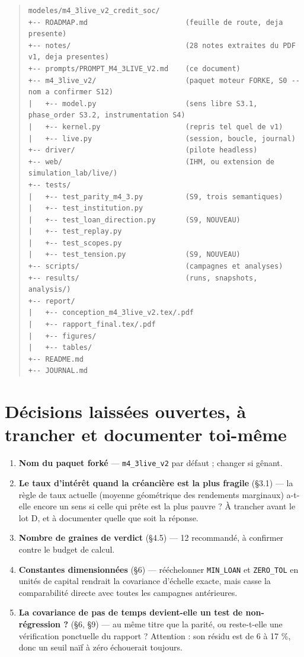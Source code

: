 \documentclass[11pt,a4paper]{article}
\newcommand{\code}[1]{\texttt{#1}}
\begin{document}
\begin{quote}\footnotesize
\begin{verbatim}
modeles/m4_3live_v2_credit_soc/
+-- ROADMAP.md                       (feuille de route, deja presente)
+-- notes/                           (28 notes extraites du PDF v1, deja presentes)
+-- prompts/PROMPT_M4_3LIVE_V2.md    (ce document)
+-- m4_3live_v2/                     (paquet moteur FORKE, S0 -- nom a confirmer S12)
|   +-- model.py                     (sens libre S3.1, phase_order S3.2, instrumentation S4)
|   +-- kernel.py                    (repris tel quel de v1)
|   +-- live.py                      (session, boucle, journal)
+-- driver/                          (pilote headless)
+-- web/                             (IHM, ou extension de simulation_lab/live/)
+-- tests/
|   +-- test_parity_m4_3.py          (S9, trois semantiques)
|   +-- test_institution.py
|   +-- test_loan_direction.py       (S9, NOUVEAU)
|   +-- test_replay.py
|   +-- test_scopes.py
|   +-- test_tension.py              (S9, NOUVEAU)
+-- scripts/                         (campagnes et analyses)
+-- results/                         (runs, snapshots, analysis/)
+-- report/
|   +-- conception_m4_3live_v2.tex/.pdf
|   +-- rapport_final.tex/.pdf
|   +-- figures/
|   +-- tables/
+-- README.md
+-- JOURNAL.md
\end{verbatim}
\end{quote}

\bigskip

\setcounter{section}{11}
\section{Décisions laissées ouvertes, à trancher et documenter toi-même}

\begin{enumerate}
\item \textbf{Nom du paquet forké} --- \code{m4\_3live\_v2} par défaut ; changer si gênant.
\item \textbf{Le taux d'intérêt quand la créancière est la plus fragile} (§3.1) --- la règle de taux actuelle (moyenne géométrique des rendements marginaux) a-t-elle encore un sens si celle qui prête est la plus pauvre ? À trancher avant le lot D, et à documenter quelle que soit la réponse.
\item \textbf{Nombre de graines de verdict} (§4.5) --- 12 recommandé, à confirmer contre le budget de calcul.
\item \textbf{Constantes dimensionnées} (§6) --- rééchelonner \code{MIN\_LOAN} et \code{ZERO\_TOL} en unités de capital rendrait la covariance d'échelle exacte, mais casse la comparabilité directe avec toutes les campagnes antérieures.
\item \textbf{La covariance de pas de temps devient-elle un test de non-régression ?} (§6, §9) --- au même titre que la parité, ou reste-t-elle une vérification ponctuelle du rapport ? Attention : son résidu est de 6 à 17 \%, donc un seuil naïf à zéro échouerait toujours.
\end{enumerate}
\end{document}
